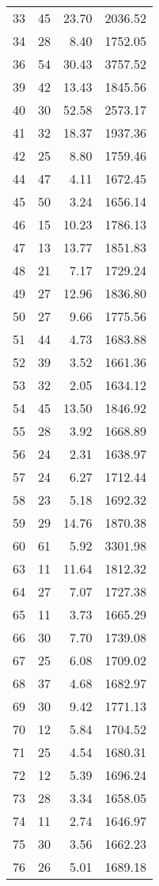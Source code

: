 \begin{appendix}
\begin{longtable}{rrrr}
33 & 45 & 23.70 & 2036.52 \\
34 & 28 & 8.40 & 1752.05 \\
36 & 54 & 30.43 & 3757.52 \\
39 & 42 & 13.43 & 1845.56 \\
40 & 30 & 52.58 & 2573.17 \\
41 & 32 & 18.37 & 1937.36 \\
42 & 25 & 8.80 & 1759.46 \\
44 & 47 & 4.11 & 1672.45 \\
45 & 50 & 3.24 & 1656.14 \\
46 & 15 & 10.23 & 1786.13 \\
47 & 13 & 13.77 & 1851.83 \\
48 & 21 & 7.17 & 1729.24 \\
49 & 27 & 12.96 & 1836.80 \\
50 & 27 & 9.66 & 1775.56 \\
51 & 44 & 4.73 & 1683.88 \\
52 & 39 & 3.52 & 1661.36 \\
53 & 32 & 2.05 & 1634.12 \\
54 & 45 & 13.50 & 1846.92 \\
55 & 28 & 3.92 & 1668.89 \\
56 & 24 & 2.31 & 1638.97 \\
57 & 24 & 6.27 & 1712.44 \\
58 & 23 & 5.18 & 1692.32 \\
59 & 29 & 14.76 & 1870.38 \\
60 & 61 & 5.92 & 3301.98 \\
63 & 11 & 11.64 & 1812.32 \\
64 & 27 & 7.07 & 1727.38 \\
65 & 11 & 3.73 & 1665.29 \\
66 & 30 & 7.70 & 1739.08 \\
67 & 25 & 6.08 & 1709.02 \\
68 & 37 & 4.68 & 1682.97 \\
69 & 30 & 9.42 & 1771.13 \\
70 & 12 & 5.84 & 1704.52 \\
71 & 25 & 4.54 & 1680.31 \\
72 & 12 & 5.39 & 1696.24 \\
73 & 28 & 3.34 & 1658.05 \\
74 & 11 & 2.74 & 1646.97 \\
75 & 30 & 3.56 & 1662.23 \\
76 & 26 & 5.01 & 1689.18 \\
\bottomrule
\end{longtable}


\end{appendix}
